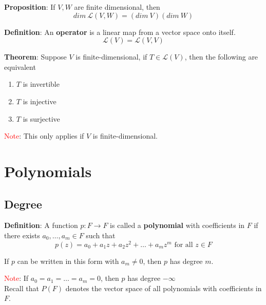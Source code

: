 \documentclass[a4paper, 10pt]{report}
\begin{document}
 \begin{framed}
    \textbf{Proposition}: If $V, W$ are finite dimensional, then 
    \[
       dim\ \mathcal{L}(V, W) = (dim\ V)(dim\ W)
    \] 
\end{framed}

\begin{framed}
   \textbf{Definition}: An \textbf{operator} is a linear map from a vector space onto itself. \\
   \[
      \mathcal{L} (V) = \mathcal{L}(V, V)
   \] 
\end{framed}

\begin{framed}
   \textbf{Theorem}: Suppose $V$ is finite-dimensional, if $T \in \mathcal{L}(V)$, then the following are equivalent
   \begin{enumerate}
      \item $T$ is invertible
      \item $T$ is injective
      \item $T$ is surjective
   \end{enumerate}

   \textcolor{red}{Note}: This only applies if $V$ is finite-dimensional. 
\end{framed}

\chapter{Polynomials}

\section{Degree}
\begin{framed}
   \textbf{Definition}: A function $p: F \rightarrow F$ is called a \textbf{polynomial} with coefficients in $F$ if there exists $a_0, \hdots, a_m \in F$  such that
   \[
     p(z) = a_0 + a_1 z + a_2 z^2 + \hdots + a_m z^m  \text{ for all } z \in F
   \] 

   If $p$ can be written in this form with $a_m \neq 0$, then $p$ has degree $m$. 
\end{framed}

\textcolor{red}{Note}: If $a_0 = a_1 = \hdots = a_m = 0$, then $p$ has degree $-\infty$ \\

Recall that $P(F)$ denotes the vector space of all polynomials with coefficients in $F$. \\
\end{document}
